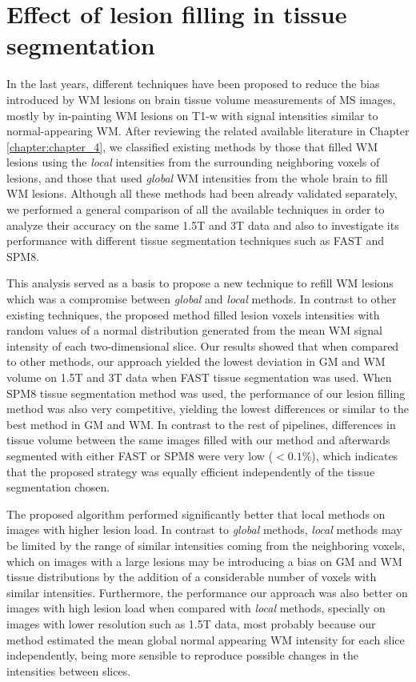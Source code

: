 \section{Effect of lesion filling in tissue segmentation}

In the last years, different techniques have been proposed to reduce the bias introduced by WM lesions on brain tissue volume measurements of MS images, mostly by in-painting WM lesions on T1-w with signal intensities similar to normal-appearing WM.  After reviewing the related available literature in Chapter \ref{chapter:chapter_4}, we classified existing methods by those that filled WM lesions using the \textit{local} intensities from the surrounding neighboring voxels of lesions, and those that used \textit{global} WM intensities from the whole brain to fill WM lesions. Although all these methods had been already validated separately, we performed a general comparison of all the available techniques in order to analyze their accuracy on the same 1.5T and 3T data and also to investigate its performance with different tissue segmentation techniques such as FAST and SPM8.

This analysis served as a basis to propose a new technique to refill WM lesions which was a compromise between \textit{global} and \textit{local} methods. In contrast to other existing techniques, the proposed method filled lesion voxels intensities with random values of a normal distribution generated from the mean WM signal intensity of each two-dimensional slice. Our results showed that when compared to other methods, our approach yielded the lowest deviation in GM and WM volume on 1.5T and 3T data when FAST tissue segmentation was used. When SPM8 tissue segmentation method was used, the performance of our lesion filling method was also very competitive, yielding the lowest differences or similar to the best method in GM and WM. In contrast to the rest of pipelines, differences in tissue volume between the same images filled with our method and afterwards segmented with either FAST or SPM8 were very low ($<0.1\%$), which indicates that the proposed strategy was equally efficient independently of the tissue segmentation chosen.

The proposed algorithm performed significantly better that local methods on images with higher lesion load. In contrast to \textit{global} methods, \textit{local} methods may be limited by the range of similar intensities coming from the neighboring voxels, which on images with a large lesions may be introducing a bias on GM and WM tissue distributions by the addition of a considerable number of voxels with similar intensities. Furthermore, the performance our approach was also better on images with high lesion load when compared with \textit{local} methods, specially on images with lower resolution such as 1.5T data, most probably because our method estimated the mean global normal appearing WM intensity for each slice independently, being more sensible to reproduce possible changes in the intensities between slices.



